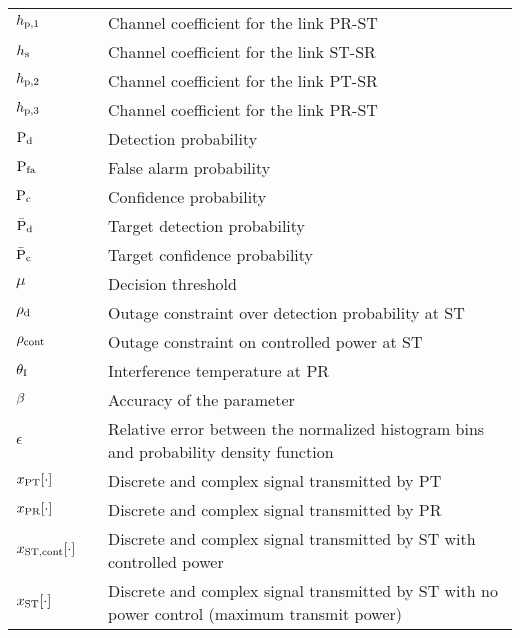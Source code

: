 \begin{longtable}{p{}p{}p{}}
       $h_{\text{p,1}}$                  & &             Channel coefficient for the link PR-ST \\
       $h_{\text{s}}$                   & &     Channel coefficient for the link ST-SR \\
       $h_{\text{p,2}}$                  & &     Channel coefficient for the link PT-SR \\
       $h_{\text{p,3}}$                 & &             Channel coefficient for the link PR-ST \\

       $\text{P}_{\text{d}}$                   & &             Detection probability \\ 
       $\text{P}_{\text{fa}}$                  & &             False alarm probability \\ 
       $\text{P}_{\text{c}}$                  & &             Confidence probability \\ 
       $\bar{\text{P}}_{\text{d}}$                  & &             Target detection probability \\ 
       $\bar{\text{P}}_{\text{c}}$                 & &             Target confidence probability \\ 
       $\mu$                   & &             Decision threshold \\ 
       $\rho_{\text{d}}$                  & &             Outage constraint over detection probability at ST \\ 
       $\rho_{\text{cont}}$                  & &             Outage constraint on controlled power at ST \\ 
       $\theta_{\text{I}}$                  & &             Interference temperature at PR \\ 
       $\beta$	               & &             Accuracy of the parameter \\	
       $\epsilon$	       & &             Relative error between the normalized histogram bins and probability density function  \\	

	$x_{\text{PT}}[\cdot]$       & &             Discrete and complex signal transmitted by PT \\	
	$x_{\text{PR}}[\cdot]$       & &             Discrete and complex signal transmitted by PR \\	
	$x_{\text{ST,cont}}[\cdot]$       & &             Discrete and complex signal transmitted by ST with controlled power \\	
	$x_{\text{ST}}[\cdot]$       & &             Discrete and complex signal transmitted by ST with no power control (maximum transmit power) \\	


\end{longtable}
